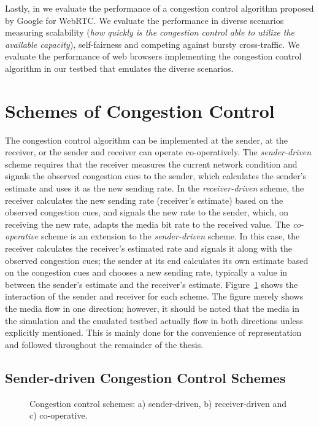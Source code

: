 Lastly, in  we evaluate the performance of a congestion
control algorithm proposed by Google for WebRTC. We evaluate the performance
in diverse scenarios measuring scalability (\emph{how quickly is the
congestion control able to utilize the available capacity}), self-fairness and
competing against bursty cross-traffic. We evaluate the performance of
web browsers implementing the congestion control algorithm in our testbed that
emulates the diverse scenarios.

\section{Schemes of Congestion Control}

The congestion control algorithm can be implemented at the sender, at the
receiver, or the sender and receiver can operate co-operatively. The
\emph{sender-driven} scheme requires that the receiver measures the current
network condition and signals the observed congestion cues to the sender, which
calculates the sender's estimate and uses it as the new sending rate. In the
\emph{receiver-driven} scheme, the receiver calculates the new sending rate
(receiver's estimate) based on the observed congestion cues, and signals the
new rate to the sender, which, on receiving the new rate, adapts the media bit
rate to the received value. The \emph{co-operative} scheme is an extension to the
\emph{sender-driven} scheme. In this case, the receiver calculates the
receiver's estimated rate and signals it along with the observed congestion
cues; the sender at its end calculates its own estimate based on the
congestion cues and chooses a new sending rate, typically a value in between the
sender's estimate and the receiver's estimate. Figure~\ref{fig:cc:scheme}
shows the interaction of the sender and receiver for each scheme. The figure
merely shows the media flow in one direction; however, it should be noted that
the media in the simulation and the emulated testbed actually flow in both
directions unless explicitly mentioned. This is mainly done for the
convenience of representation and followed throughout the remainder of the
thesis.

\subsection{Sender-driven Congestion Control Schemes}

\begin{figure}[!t]
  \centerline{
  }
  \centerline{
  }
  \centerline{
  }
  \caption{Congestion control schemes: a) sender-driven, b) receiver-driven
and c) co-operative.}
  \label{fig:cc:scheme}
\end{figure}

